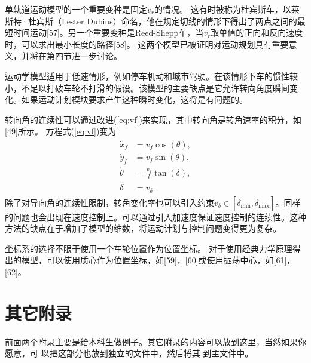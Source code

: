 单轨道运动模型的一个重要变种是固定$v_r$的情况。 这有时被称为杜宾斯车，以莱斯特·杜宾斯（Lester Dubins）命名，他在规定切线的情形下得出了两点之间的最短时间运动[57]。另一个重要变种是Reed-Shepp车，当$v_r$取单值的正向和反向速度时，可以求出最小长度的路径[58]。 这两个模型已被证明对运动规划具有重要意义，并将在第四节进一步讨论。

运动学模型适用于低速情形，例如停车机动和城市驾驶。在该情形下车的惯性较小，不足以打破车轮不打滑的假设。该模型的主要缺点是它允许转向角度瞬间变化。如果运动计划模块要求产生这种瞬时变化，这将是有问题的。

转向角的连续性可以通过改进(\ref{eq:vf})来实现，其中转向角是转角速率的积分，如[49]所示。 方程式(\ref{eq:vf})变为
\begin{align}
\begin{split}
\dot{x}_f&= v_f\cos(\theta),\\
\dot{y}_f&= v_f\sin(\theta),\\
\dot{\theta}&=\frac{v_f}{l}\tan(\delta),\\
\dot{\delta}&=v_{\delta}.
\end{split}
\end{align}
除了对导向角的连续性限制，转角变化率也可以引入约束$v_{\delta}\in [\dot{\delta}_{\min},\dot{\delta}_{\max}]$。同样的问题也会出现在速度控制上。可以通过引入加速度保证速度控制的连续性。这种方法的缺点在于增加了模型的维数，将运动计划与控制问题变得更为复杂。

坐标系的选择不限于使用一个车轮位置作为位置坐标。 对于使用经典力学原理得出的模型，可以使用质心作为位置坐标，如[59]，[60]或使用振荡中心，如[61]，[62]。

\chapter{其它附录}
前面两个附录主要是给本科生做例子。其它附录的内容可以放到这里，当然如果你愿意，可
以把这部分也放到独立的文件中，然后将其  到主文件中。
